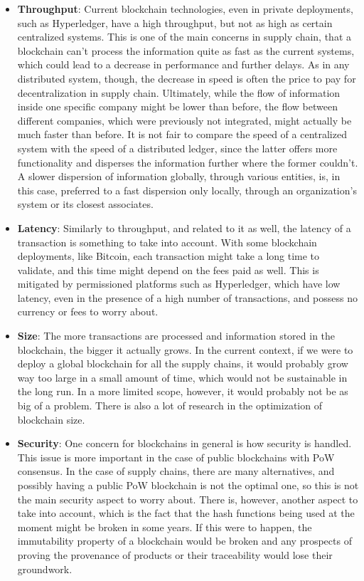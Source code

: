 \begin{itemize}
\item \textbf{Throughput}: Current blockchain technologies, even in private deployments, such as Hyperledger, have a high throughput, but not as high as certain centralized systems. This is one of the main concerns in supply chain, that a blockchain can't process the information quite as fast as the current systems, which could lead to a decrease in performance and further delays. As in any distributed system, though, the decrease in speed is often the price to pay for decentralization in supply chain. Ultimately, while the flow of information inside one specific company might be lower than before, the flow between different companies, which were previously not integrated, might actually be much faster than before. It is not fair to compare the speed of a centralized system with the speed of a distributed ledger, since the latter offers more functionality and disperses the information further where the former couldn't. A slower dispersion of information globally, through various entities, is, in this case, preferred to a fast dispersion only locally, through an organization's system or its closest associates.
\item \textbf{Latency}: Similarly to throughput, and related to it as well, the latency of a transaction is something to take into account. With some blockchain deployments, like Bitcoin, each transaction might take a long time to validate, and this time might depend on the fees paid as well. This is mitigated by permissioned platforms such as Hyperledger, which have low latency, even in the presence of a high number of transactions, and possess no currency or fees to worry about.
\item \textbf{Size}: The more transactions are processed and information stored in the blockchain, the bigger it actually grows. In the current context, if we were to deploy a global blockchain for all the supply chains, it would probably grow way too large in a small amount of time, which would not be sustainable in the long run. In a more limited scope, however, it would probably not be as big of a problem. There is also a lot of research in the optimization of blockchain size.
\item \textbf{Security}: One concern for blockchains in general is how security is handled. This issue is more important in the case of public blockchains with PoW consensus. In the case of supply chains, there are many alternatives, and possibly having a public PoW blockchain is not the optimal one, so this is not the main security aspect to worry about. There is, however, another aspect to take into account, which is the fact that the hash functions being used at the moment might be broken in some years. If this were to happen, the immutability property of a blockchain would be broken and any prospects of proving the provenance of products or their traceability would lose their groundwork.
\end{itemize}

